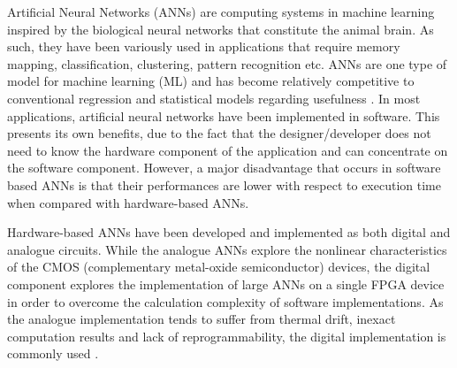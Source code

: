 
Artificial Neural Networks (ANNs) are computing systems in machine learning inspired by the biological neural networks that constitute the animal brain. As such, they have been variously used in applications that require memory mapping, classification, clustering, pattern recognition etc. ANNs are one type of model for machine learning (ML) and has become relatively competitive to conventional regression and statistical models regarding usefulness \cite{ANNreview}. In most applications, artificial neural networks have been implemented in software. This presents its own benefits, due to the fact that the designer/developer does not need to know the hardware component of the application and can concentrate on the software component. However, a major disadvantage that occurs in software based ANNs is that their performances are lower with respect to execution time when compared with hardware-based ANNs.

Hardware-based ANNs have been developed and implemented as both digital and analogue circuits. While the analogue ANNs explore the nonlinear characteristics of the CMOS (complementary metal-oxide semiconductor) devices, the digital component explores the implementation of large ANNs on a single FPGA device in order to overcome the calculation complexity of software implementations. As the analogue implementation tends to suffer from thermal drift, inexact computation results and lack of reprogrammability, the digital implementation is commonly used \cite{efficientDigitalImpl}.